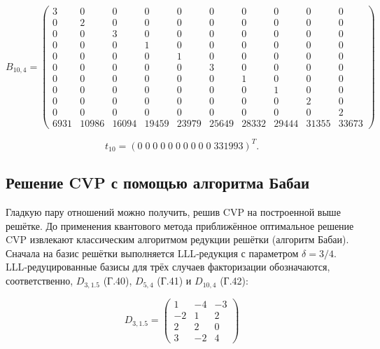 \begin{equation}
B_{10,4}=
\begin{pmatrix}
 3    & 0    & 0    & 0    & 0    & 0    & 0    & 0    & 0    & 0    \\
 0    & 2    & 0    & 0    & 0    & 0    & 0    & 0    & 0    & 0    \\
 0    & 0    & 3    & 0    & 0    & 0    & 0    & 0    & 0    & 0    \\
 0    & 0    & 0    & 1    & 0    & 0    & 0    & 0    & 0    & 0    \\
 0    & 0    & 0    & 0    & 1    & 0    & 0    & 0    & 0    & 0    \\
 0    & 0    & 0    & 0    & 0    & 3    & 0    & 0    & 0    & 0    \\
 0    & 0    & 0    & 0    & 0    & 0    & 1    & 0    & 0    & 0    \\
 0    & 0    & 0    & 0    & 0    & 0    & 0    & 1    & 0    & 0    \\
 0    & 0    & 0    & 0    & 0    & 0    & 0    & 0    & 2    & 0    \\
 0    & 0    & 0    & 0    & 0    & 0    & 0    & 0    & 0    & 2    \\
 6931 & 10986& 16094& 19459& 23979& 25649& 28332& 29444& 31355& 33673
\end{pmatrix}
\end{equation}

\begin{equation}
t_{10} = (0\; 0\; 0\; 0\; 0\; 0\; 0\; 0\; 0\; 0\; 331993)^{T}.
\end{equation}

\subsection*{Решение CVP с помощью алгоритма Бабаи}

Гладкую пару отношений можно получить, решив CVP на построенной выше решётке.
До применения квантового метода приближённое оптимальное решение CVP извлекают
классическим алгоритмом редукции решётки (алгоритм Бабаи). Сначала на базис
решётки выполняется LLL‑редукция с параметром \(\delta=3/4\).
LLL‑редуцированные базисы для трёх случаев факторизации обозначаются,
соответственно, \(D_{3,1.5}\) (Г.40), \(D_{5,4}\) (Г.41) и \(D_{10,4}\) (Г.42):

\begin{equation}
D_{3,1.5} =
\begin{pmatrix}
 1 & -4 & -3 \\
-2 &  1 &  2 \\
 2 &  2 &  0 \\
 3 & -2 &  4
\end{pmatrix}
\end{equation}

